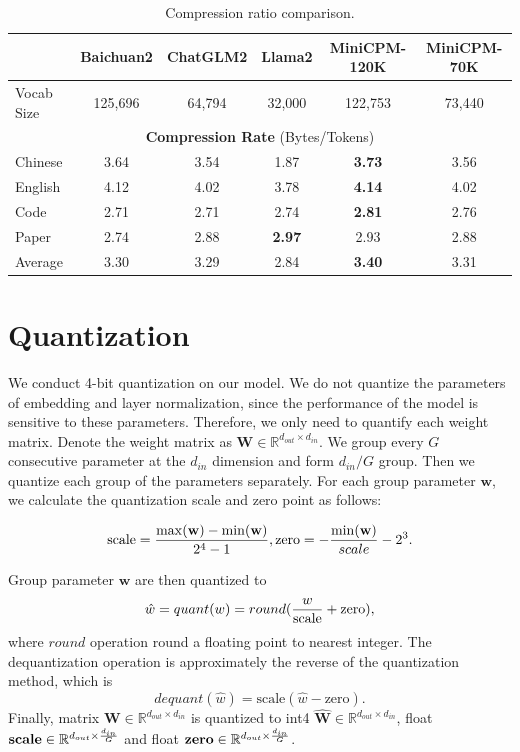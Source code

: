 \documentclass[dvipsnames]{article}
\begin{document}
\begin{table}[htbp]
\centering
\begin{tabular}{lccccc}
\toprule
  & {\textbf{Baichuan2}}  & {\textbf{ChatGLM2}} & {\textbf{Llama2}} & {\textbf{MiniCPM-120K}}  & {\textbf{MiniCPM-70K}}\\
\midrule
Vocab Size & 125,696 & 64,794 & 32,000 & 122,753 & 73,440\\
\midrule
\multicolumn{6}{c}{\textbf{Compression Rate} (Bytes/Tokens) }\\
\midrule
Chinese & 3.64   & 3.54  & 1.87  & \textbf{3.73} &  3.56 \\
English & 4.12   & 4.02  & 3.78  & \textbf{4.14} & 4.02 \\
Code    & 2.71   & 2.71  & 2.74  & \textbf{2.81} & 2.76 \\
Paper   & 2.74   & 2.88  & \textbf{2.97}  & 2.93 & 2.88\\
\midrule
Average & 3.30   & 3.29  & 2.84  & \textbf{3.40}  & 3.31 \\
\bottomrule
\end{tabular}
\caption{Compression ratio comparison.}
\label{tab:compression_ratio}
\end{table}

\section{Quantization}
\label{app:quantization}
We conduct 4-bit quantization on our model. We do not quantize the parameters of embedding and layer normalization, since the performance of the model is sensitive to these parameters. Therefore, we only need to quantify each weight matrix. Denote the weight matrix as $\mathbf{W}\in \mathbb{R}^{d_{out}\times d_{in}}$. We group every $G$ consecutive parameter at the $d_{in}$ dimension and form $d_{in}/G$ group. Then we quantize each group of the parameters separately. For each group parameter $\mathbf{w}$, we calculate the quantization scale and zero point as follows:

$$
\text{scale}= {\max(\mathbf{w}) - \min(\mathbf{w}) \over {2^4-1}}, \text{zero} = - {\min(\mathbf{w}) \over scale} - 2^3.
$$

Group parameter $\mathbf{w}$ are then quantized to $$\hat w = quant(w) = round({w\over \text{scale}}+\text{zero}),$$ where $round$ operation round a floating point to nearest integer. The dequantization operation is approximately the reverse of the quantization method, which is $$dequant(\hat w) = \text{scale}(\hat w - \text{zero}).$$ Finally, matrix $\mathbf{W}\in \mathbb{R}^{d_{out}\times d_{in}}$ is quantized to int4 $\mathbf{\hat{W}}\in \mathbb{R}^{d_{out}\times d_{in}}$, float $\textbf{scale}\in \mathbb{R}^{d_{out}\times {d_{in}\over G}}$ and float $\textbf{zero}\in \mathbb{R}^{d_{out}\times {d_{in}\over G}}$.
\end{document}
